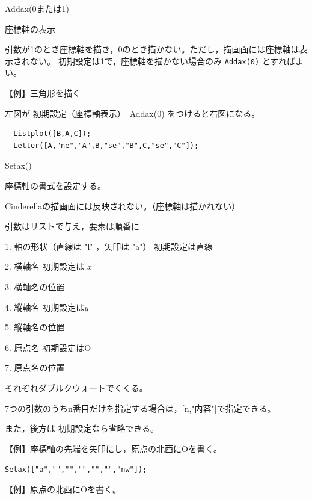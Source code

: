 \documentclass[papersize,a4paper,12pt,uplatex]{jsarticle}
\begin{document}
\vspace{\baselineskip}
\begin{description}
\hypertarget{addax}{}
\item[関数]  Addax(0または1)
\item[機能]  座標軸の表示
\item[説明]  引数が1のとき座標軸を描き，0のとき描かない。ただし，描画面には座標軸は表示されない。
初期設定は1で，座標軸を描かない場合のみ \verb|Addax(0)| とすればよい。

\vspace{\baselineskip}
【例】三角形を描く

左図が 初期設定（座標軸表示）　Addax(0) をつけると右図になる。

\begin{verbatim}
  Listplot([B,A,C]);
  Letter([A,"ne","A",B,"se","B",C,"se","C"]);
\end{verbatim}

\vspace{\baselineskip}
\hspace{10mm}   


\hypertarget{setax}{}
\item[関数]  Setax()
\item[機能]  座標軸の書式を設定する。
\item[説明]  Cinderellaの描画面には反映されない。（座標軸は描かれない）

引数はリストで与え，要素は順番に

1. 軸の形状（直線は "l" ，矢印は "a"） 初期設定は直線

2. 横軸名   初期設定は $x$ 

3. 横軸名の位置

4. 縦軸名   初期設定は$y$

5. 縦軸名の位置

6. 原点名   初期設定はO

7. 原点名の位置

それぞれダブルクウォートでくくる。

7つの引数のうちn番目だけを指定する場合は，[n,"内容"]で指定できる。

また，後方は 初期設定なら省略できる。

\vspace{\baselineskip}
【例】座標軸の先端を矢印にし，原点の北西にOを書く。
    
\hspace{10mm} \verb|Setax(["a","","","","","","nw"]);|

【例】原点の北西にOを書く。


\end{description}
\end{document}
